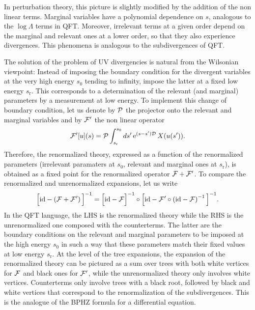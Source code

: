 \documentclass[12pt,here,feynmf]{article}
\begin{document}
In perturbation theory, this picture is slightly modified by the addition of the non linear terms. Marginal variables have a polynomial dependence on $s$, analogous to the $\log\Lambda$ terms in QFT. Moreover, irrelevant terms at a given order depend on the marginal and relevant ones at a lower order, so that they also experience divergences. This phenomena is analogous to the subdivergences of QFT.

The solution of the problem of UV divergencies is natural from the Wilsonian viewpoint: Instead of imposing the boundary condition for the divergent variables at the very high energy $s_{0}$ tending to infinity, impose the latter at a fixed low energy $s_{\mathrm{r}}$. This corresponds to a determination of the relevant (and marginal) parameters by a measurement at low energy. To implement this change of boundary condition, let us denote by ${\cal P}$ the projector onto the relevant and marginal variables and by ${\cal F}'$ the non linear operator  
\begin{equation}
{\cal F}'[u](s)={\cal P}
\int_{s_{\mathrm{r}}}^{s_{0}}ds'\, \mathrm{e}^{(s-s'){\cal D}}\,X(u(s')).
\end{equation}
Therefore, the renormalized theory, expressed as a function of the renormalized parameters (irrelevant paramaters at $s_{0}$, relevant and marginal ones at $s_{\mathrm{r}}$), is obtained as a fixed point for the renormalized operator ${\cal F}+{\cal F}'$. To compare the renormalized and unrenormalized expansions, let us write
\begin{equation}
\Big[\mathrm{id}-\left({\cal F}+{\cal F}'\right)\Big]^{-1}= \Big[\mathrm{id}-{\cal F}\Big]^{-1}\circ
\Big[\mathrm{id}-{\cal F}'\circ\left(\mathrm{id}-{\cal F}\right)^{-1}\Big]^{-1}.
\end{equation}
In the QFT language, the LHS is the renormalized theory while the RHS is the unrenormalized one composed with the counterterms. The latter are the boundary conditions on the relevant and marginal parameters to be imposed at the high energy $s_{0}$ in such a way that these parameters match their fixed values at low energy $s_{\mathrm{r}}$. At the level of the tree expansions, the expansion of the renormalized theory can be pictured as a sum over trees with  both white vertices for ${\cal F}$ and black ones for ${\cal F}'$, while the unrenormalized theory only involves white vertices.
Counterterms only involve trees with a black root, followed by black and white vertices that correspond to the renormalization of the subdivergences. This is the analogue of the BPHZ formula for a differential equation.  
\end{document}
